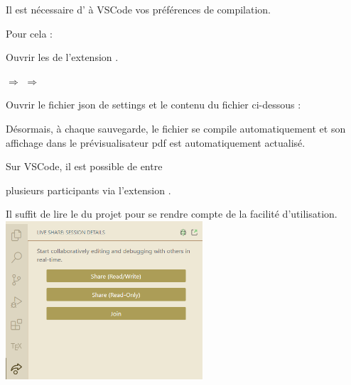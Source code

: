 \begin{None}
\begin{tcbenumerate}[2]
        \begin{Remarque}

            Il est nécessaire d' à VSCode vos préférences de compilation. 

            Pour cela : 

            \begin{tcbenumerate}[1][1][alph]
                \tcbitem Ouvrir les  de l'extension . 

                 $\Longrightarrow$  $\Longrightarrow$  

                \tcbitem Ouvrir le fichier json de settings et  le contenu du fichier ci-dessous : 
                

                \tcbitem Désormais, à chaque sauvegarde, le fichier se compile automatiquement et son affichage dans le prévisualisateur pdf est automatiquement actualisé. 
            \end{tcbenumerate}

        \end{Remarque}
        \tcbitem[raster multicolumn=2]  Sur VSCode, il est possible de  entre 
        
        \begin{MultiColonnes}{3}
                \tcbitem[raster multicolumn=2] plusieurs participants via l'extension .
                
                Il suffit de lire le  du projet pour se rendre compte de la facilité d'utilisation.
                \tcbitem[halign=center] \includegraphics[width=0.55\textwidth]{images/IDE/live_share_snippet.png}
            \end{MultiColonnes}
    \end{tcbenumerate}
\end{None}

